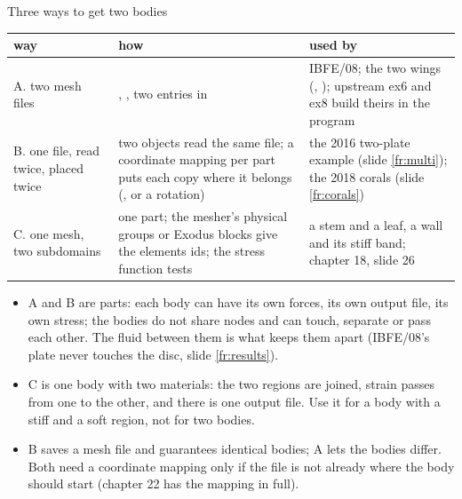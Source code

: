 \documentclass[aspectratio=169,11pt]{beamer}
\begin{document}
\begin{frame}{Three ways to get two bodies}
\label{fr:ways}
\scriptsize
\begin{tabular}{@{}L{0.24\textwidth}L{0.36\textwidth}L{0.32\textwidth}@{}}
\toprule
way & how & used by \\
\midrule
A. two mesh files & , , two entries in  & IBFE/08; the two wings (, ); upstream ex6 and ex8 build theirs in the program \\
B. one file, read twice, placed twice & two  objects read the same file; a coordinate mapping per part puts each copy where it belongs (, or a rotation) & the 2016 two-plate example (slide \ref{fr:multi}); the 2018 corals (slide \ref{fr:corals}) \\
C. one mesh, two subdomains & one part; the mesher's physical groups or Exodus blocks give the elements ids; the stress function tests  & a stem and a leaf, a wall and its stiff band; chapter 18, slide 26 \\
\bottomrule
\end{tabular}

\medskip
\begin{itemize}
  \item A and B are parts: each body can have its own forces, its own output file, its own stress; the bodies do not share nodes and can touch, separate or pass each other. The fluid between them is what keeps them apart (IBFE/08's plate never touches the disc, slide \ref{fr:results}).
  \item C is one body with two materials: the two regions are joined, strain passes from one to the other, and there is one output file. Use it for a body with a stiff and a soft region, not for two bodies.
  \item B saves a mesh file and guarantees identical bodies; A lets the bodies differ. Both need a coordinate mapping only if the file is not already where the body should start (chapter 22 has the mapping in full).
\end{itemize}
\end{frame}
\end{document}
